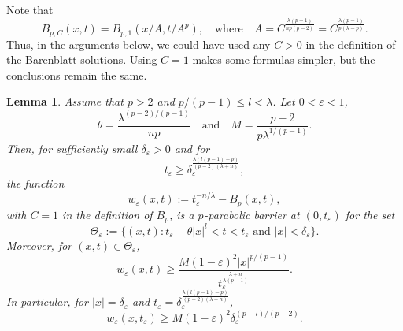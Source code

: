 \documentclass[a4paper, twoside]{article}
\theoremstyle{propositional}
\newtheorem{lem}[thm]{Lemma}
\theoremstyle{descriptive}
\numberwithin{equation}{section}
\newcommand{\eps}{\varepsilon}
\newcommand{\de}{\delta}
\newcommand{\p}{{$p\mspace{1mu}$}}
\newcommand{\la}{\lambda}
\begin{document}
Note that 
\[
B_{p,C} (x,t) = B_{p,1} (x/A,t/A^p),
\quad \text{where} \quad
A= C^{\frac{\la(p-1)}{np(p-2)}}  = C^{\frac{\la(p-1)}{p(\la-p)}}.
\]
Thus, in the arguments below, we could have used any $C>0$ in the definition
of the Barenblatt solutions.
Using $C=1$ makes some formulas simpler, but the conclusions remain
the same.


\begin{lem} \label{lem-Bar-w}
Assume that $p>2$ and $p/(p-1)\le l <\la$.
Let $0<\eps<1$, 
\begin{equation}      \label{eq-theta-M}
 \theta  
 =\frac{\la^{(p-2)/(p-1)}}{np}
 \quad \text{and} \quad
   M = \frac{p-2}{p \la^{1/(p-1)}}.
\end{equation}
Then, for sufficiently small $\de_\eps>0$ and for 
\begin{equation}  \label{eq-t_eps}
t_\eps \ge \de_\eps^{\frac{\la (l(p-1)-p)}{(p-2)(\la+n)}},
\end{equation}
the function
\[
w_\eps(x,t):= t_\eps^{-n/\la} - B_p(x,t),
\]
with $C=1$ in the definition of $B_p$,
is  a \p-parabolic barrier at $(0,t_\eps)$ for the set
\[
\Theta_\eps:=\{(x,t): 
t_\eps-\theta |x|^l< t < t_\eps
\text{ and }  |x| <  \de_\eps\}.  
\]
Moreover, for $(x,t)\in \overline{\Theta}_\eps$,
\begin{equation}   \label{eq-weps-new}
w_{\eps}(x,t) \ge \frac{M(1-\eps)^2 |x|^{p/(p-1)}}{ t_\eps^{\frac{\la+n}{\la(p-1)}} }.
\end{equation}
In particular, for $|x|=\de_\eps$ and 
$t_\eps= \de_\eps^{\frac{\la (l(p-1)-p)}{(p-2)(\la+n)}}$,
\begin{equation}   \label{eq-est-weps-at-de-eps-teps}
w_{\eps}(x,t_\eps) \ge M(1-\eps)^2 \de_\eps^{(p-l)/(p-2)}.
\end{equation}
\end{lem}
\end{document}
